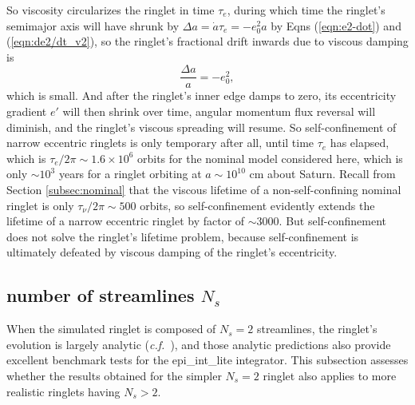 \documentclass[preprint]{aastex62}
\begin{document}
So viscosity circularizes the ringlet in time $\tau_e$, during which time the ringlet's
semimajor axis will have shrunk by $\Delta a=\dot{a}\tau_e=-e_0^2a$ by Eqns (\ref{eqn:e2-dot})
and (\ref{eqn:de2/dt_v2}), so the ringlet's
fractional drift inwards due to viscous damping is
\begin{equation}
    \label{eqn:delta-a}
    \frac{\Delta a}{a} = -e_0^2,
\end{equation}
which is small. And after the ringlet's inner edge damps to zero, its eccentricity gradient $e'$
will then shrink over time, angular momentum flux reversal will diminish, and the ringlet's 
viscous spreading will resume. So self-confinement of narrow eccentric ringlets is only temporary
after all, until time $\tau_e$ has elapsed, which is $\tau_e/2\pi\sim1.6\times10^6$ orbits for 
the nominal model considered here, which is only $\sim10^3$ years for a ringlet orbiting at 
$a\sim10^{10}$ cm about Saturn. Recall from Section \ref{subsec:nominal}
that the viscous lifetime of a non-self-confining
nominal ringlet is only $\tau_\nu/2\pi\sim500$ orbits, so self-confinement evidently
extends the lifetime of a narrow eccentric ringlet by factor of $\sim3000$. But self-confinement
does not solve the ringlet's lifetime problem, because self-confinement is ultimately
defeated by viscous damping of the ringlet's eccentricity.


\subsection{number of streamlines $N_s$}
\label{subsec:num_streamlines}

When the simulated ringlet is composed of $N_s=2$ streamlines, the ringlet's
evolution is largely analytic ({\it c.f.}\ \citealt{BGT82, BGT83}), and those analytic
predictions also provide excellent benchmark tests for the epi\_int\_lite integrator. This subsection 
assesses whether the results obtained for the simpler $N_s=2$ ringlet also applies to
more realistic ringlets having $N_s>2$.
\end{document}
